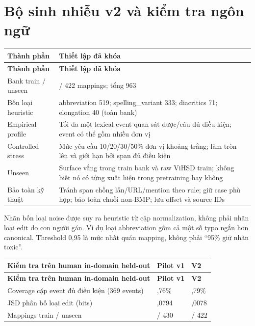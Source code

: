 \documentclass[11pt,a4paper]{article}
\newlength{\reporttablewidth}
\begin{document}
\FloatBarrier\section{Bộ sinh nhiễu v2 và kiểm tra ngôn ngữ}

\begingroup
\small
\setlength{\tabcolsep}{4pt}
\setlength{\reporttablewidth}{\dimexpr\linewidth-2\tabcolsep\relax}
\renewcommand{\arraystretch}{1.15}
\begin{longtable}{@{}>{\raggedright\arraybackslash}p{0.31000\reporttablewidth}>{\raggedright\arraybackslash}p{0.69000\reporttablewidth}@{}}
\toprule
\textbf{Thành phần} & \textbf{Thiết lập đã khóa} \\
\midrule
\endfirsthead
\toprule
\textbf{Thành phần} & \textbf{Thiết lập đã khóa} \\
\midrule
\endhead
\bottomrule
\endlastfoot
Bank train / unseen & 541 / 422 mappings; tổng 963 \\
Bốn loại heuristic & abbreviation 519; spelling\_variant 333; diacritics 71; elongation 40 (toàn bank) \\
Empirical profile & Tối đa một lexical event quan sát được/câu đủ điều kiện; event có thể gồm nhiều đơn vị \\
Controlled stress & Mức yêu cầu 10/20/30/50\% đơn vị khoảng trắng; làm tròn lên và giới hạn bởi span đủ điều kiện \\
Unseen & Surface vắng trong train bank và raw ViHSD train; không biết nó có từng xuất hiện trong pretraining hay không \\
Bảo toàn kỹ thuật & Tránh span chồng lấn/URL/mention theo rule; giữ case phù hợp; bảo toàn chuỗi non-BMP; lưu offset và source IDs \\
\end{longtable}
\endgroup

Nhãn bốn loại noise được suy ra heuristic từ cặp normalization, không phải nhãn loại edit do con người gán. Ví dụ loại abbreviation gồm cả một số typo ngắn hơn canonical. Threshold 0,95 là mức nhất quán mapping, không phải “95\% giữ nhãn toxic”.


\begingroup
\small
\setlength{\tabcolsep}{4pt}
\setlength{\reporttablewidth}{\dimexpr\linewidth-4\tabcolsep\relax}
\renewcommand{\arraystretch}{1.15}
\begin{longtable}{@{}>{\raggedright\arraybackslash}p{0.23000\reporttablewidth}>{\raggedright\arraybackslash}p{0.39000\reporttablewidth}>{\raggedright\arraybackslash}p{0.38000\reporttablewidth}@{}}
\toprule
\textbf{Kiểm tra trên human in-domain held-out} & \textbf{Pilot v1} & \textbf{V2} \\
\midrule
\endfirsthead
\toprule
\textbf{Kiểm tra trên human in-domain held-out} & \textbf{Pilot v1} & \textbf{V2} \\
\midrule
\endhead
\bottomrule
\endlastfoot
Coverage cặp event đủ điều kiện (369 events) & 22,76\% & 32,79\% \\
JSD phân bố loại edit (bits) & 0,0794 & 0,0078 \\
Mappings train / unseen & 493 / 430 & 541 / 422 \\
\end{longtable}
\endgroup
\end{document}
